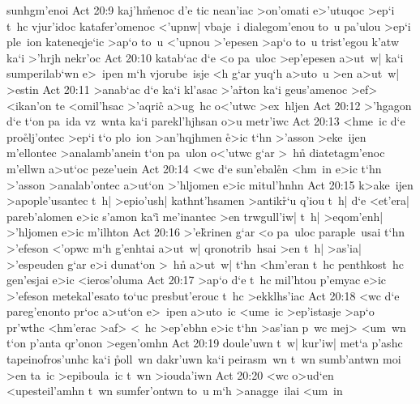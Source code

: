 sunhgm'enoi\bibvsend
\vs Act 20:9
kaj'h\r{m}enoc
d'e
tic
nean'iac
>on'omati
e>'utuqoc
>ep`i
t~hc
vjur'idoc
katafer'omenoc
<'upnw|
vbaje~i
dialegom'enou
to~u
pa'ulou
>ep`i
ple~ion
kateneqje`ic
>ap`o
to~u
<'upnou
>'epesen
>ap`o
to~u
trist'egou
k'atw
ka`i
>'hrjh
nekr'oc\bibvsend
\vs Act 20:10
katab`ac
d`e
<o
pa~uloc
>ep'epesen
a>ut~w|
ka`i
sumperilab`wn
e>~ipen
m`h
vjorube~isje
<h
g`ar
yuq`h
a>uto~u
>en
a>ut~w|
>estin\bibvsend
\vs Act 20:11
>anab`ac
d`e
ka`i
kl'asac
>'a\r{r}ton
ka`i
geus'amenoc
>ef>
<ikan'on
te
<omil'hsac
>'aqri\r{c}
a>ug~hc
o<'utwc
>ex~hljen\bibvsend
\vs Act 20:12
>'hgagon
d`e
t`on
pa~ida
vz~wnta
ka`i
parekl'hjhsan
o>u
metr'iwc\bibvsend
\vs Act 20:13
<hme~ic
d`e
pro\r{e}lj'ontec
>ep`i
t`o
plo~ion
>an'hqjhmen
\r{e}>ic
t`hn
>'asson
>eke~ijen
m'ellontec
>analamb'anein
t`on
pa~ulon
o<'utwc
g`ar
>~hn\r{}
diatetagm'enoc
m'ellwn
a>ut`oc
peze'uein\bibvsend
\vs Act 20:14
<wc
d`e
sun'ebal\r{e}n
<hm~in
e>ic
t`hn
>'asson
>analab'ontec
a>ut`on
>'hljomen
e>ic
mitul'hnhn\bibvsend
\vs Act 20:15
k>ake~ijen
>apople'usantec
t~h|
>epio'ush|
kathnt'hsamen
>antik\r{r}`u
q'iou
t~h|
d`e
<et'era|
pareb'alomen
e>ic
s'amon
ka`i\r{}
me'inantec
>en
trwgull'iw|
t~h|
>eqom'enh|
>'hljomen
e>ic
m'ilhton\bibvsend
\vs Act 20:16
>'e\r{k}rinen
g`ar
<o
pa~uloc
paraple~usai
t`hn
>'efeson
<'opwc
m`h
g'enhtai
a>ut~w|
qronotrib~hsai
>en
t~h|
>as'ia|
>'espeuden
g`ar
e>i
dunat`on
>~h\r{n}
a>ut~w|
t`hn
<hm'eran
t~hc
penthkost~hc
gen'esjai
e>ic
<ieros'oluma\bibvsend
\vs Act 20:17
>ap`o
d`e
t~hc
mil'htou
p'emyac
e>ic
>'efeson
metekal'esato
to`uc
presbut'erouc
t~hc
>ekklhs'iac\bibvsend
\vs Act 20:18
<wc
d`e
pareg'enonto
pr`oc
a>ut`on
e>~ipen
a>uto~ic
<ume~ic
>ep'istasje
>ap`o
pr'wthc
<hm'erac
>af>
<~hc
>ep'ebhn
e>ic
t`hn
>as'ian
p~wc
mej>
<um~wn
t`on
p'anta
qr'onon
>egen'omhn\bibvsend
\vs Act 20:19
doule'uwn
t~w|
kur'iw|
met`a
p'ashc
tapeinofros'unhc
ka`i
\r{p}oll~wn
dakr'uwn
ka`i
peirasm~wn
t~wn
sumb'antwn
moi
>en
ta~ic
>epiboula~ic
t~wn
>iouda'iwn\bibvsend
\vs Act 20:20
<wc
o>ud`en
<upesteil'amhn
t~wn
sumfer'ontwn
to~u
m`h
>anagge~ilai
<um~in
